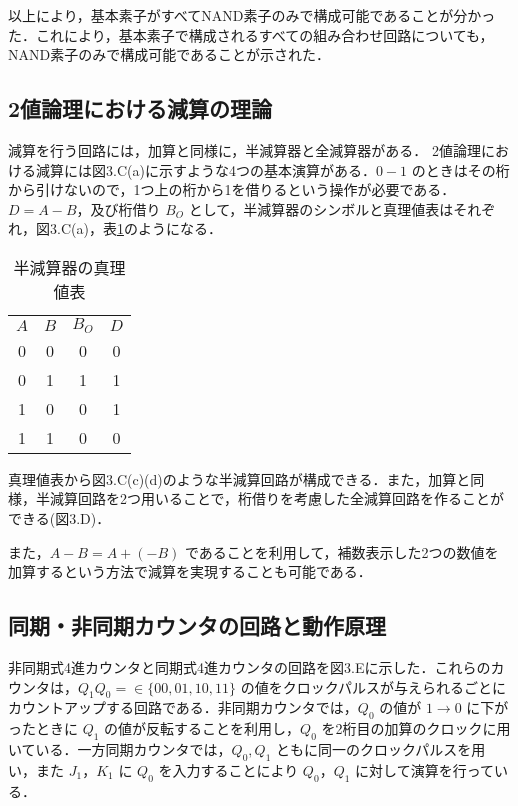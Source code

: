 以上により，基本素子がすべてNAND素子のみで構成可能であることが分かった．これにより，基本素子で構成されるすべての組み合わせ回路についても，NAND素子のみで構成可能であることが示された．

\subsection{2値論理における減算の理論}

減算を行う回路には，加算と同様に，半減算器と全減算器がある．
2値論理における減算には図3.C(a)に示すような4つの基本演算がある．$0 - 1$ のときはその桁から引けないので，1つ上の桁から1を借りるという操作が必要である．$D = A - B$，及び桁借り $B_O$ として，半減算器のシンボルと真理値表はそれぞれ，図3.C(a)，表\ref{tbl04}のようになる．

\begin{table}[!h]
    \caption{半減算器の真理値表}
    \label{tbl04}
    \begin{center}
        \begin{tabular}{|c|c||c|c|}
            \hline
            $A$ & $B$ & $B_O$ & $D$ \\
            \hhline{|=|=#=|=|}
            0   & 0   & 0     & 0   \\
            \hline
            0   & 1   & 1     & 1   \\
            \hline
            1   & 0   & 0     & 1   \\
            \hline
            1   & 1   & 0     & 0   \\
            \hline
        \end{tabular}
    \end{center}
\end{table}

真理値表から図3.C(c)(d)のような半減算回路が構成できる．また，加算と同様，半減算回路を2つ用いることで，桁借りを考慮した全減算回路を作ることができる(図3.D)．

また，$A - B = A + (-B)$ であることを利用して，補数表示した2つの数値を加算するという方法で減算を実現することも可能である．

\newpage
\subsection{同期・非同期カウンタの回路と動作原理}

非同期式4進カウンタと同期式4進カウンタの回路を図3.Eに示した．これらのカウンタは，$Q_1 Q_0 = \in \{ 00, 01, 10, 11 \}$ の値をクロックパルスが与えられるごとにカウントアップする回路である．非同期カウンタでは，$Q_0$ の値が $1 \rightarrow 0$ に下がったときに $Q_1$ の値が反転することを利用し，$Q_0$ を2桁目の加算のクロックに用いている．一方同期カウンタでは，$Q_0, Q_1$ ともに同一のクロックパルスを用い，また $J_1$，$K_1$ に $Q_0$ を入力することにより $Q_0$，$Q_1$ に対して演算を行っている．

